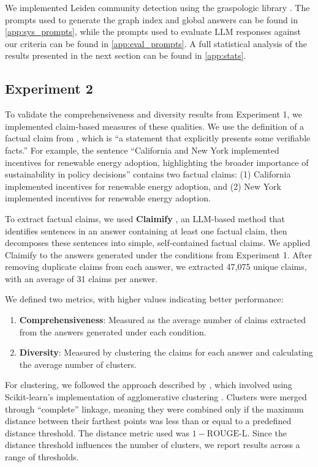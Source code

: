 \documentclass{article}
\begin{document}
We implemented Leiden community detection using the graspologic library \citep{chung2019graspy}.
The prompts used to generate the graph index and global answers can be found in \autoref{app:sys_prompts}, while the prompts used to evaluate LLM responses against our criteria can be found in \autoref{app:eval_prompts}.
A full statistical analysis of the results presented in the next section can be found in \autoref{app:stats}.

\subsection{Experiment 2}
To validate the comprehensiveness and diversity results from Experiment 1, we implemented claim-based measures of these qualities. We use the definition of a factual claim from \citet{afacta}, which is “a statement that explicitly presents some verifiable facts.” For example, the sentence “California and New York implemented incentives for renewable energy adoption, highlighting the broader importance of sustainability in policy decisions” contains two factual claims: (1) California implemented incentives for renewable energy adoption, and (2) New York implemented incentives for renewable energy adoption.

To extract factual claims, we used \textbf{Claimify} \citep{claimify}, an LLM-based method that identifies sentences in an answer containing at least one factual claim, then decomposes these sentences into simple, self-contained factual claims. We applied Claimify to the answers generated under the conditions from Experiment 1. After removing duplicate claims from each answer, we extracted 47,075 unique claims, with an average of 31 claims per answer.

We defined two metrics, with higher values indicating better performance:
\begin{enumerate}
\item \textbf{Comprehensiveness}: Measured as the average number of claims extracted from the answers generated under each condition.
\item \textbf{Diversity}: Measured by clustering the claims for each answer and calculating the average number of clusters.
\end{enumerate}

For clustering, we followed the approach described by \citet{padmakumar}, which involved using Scikit-learn’s implementation of agglomerative clustering \citep{perdregosa}. Clusters were merged through “complete” linkage, meaning they were combined only if the maximum distance between their farthest points was less than or equal to a predefined distance threshold. The distance metric used was $1 - \text{ROUGE-L}$. Since the distance threshold influences the number of clusters, we report results across a range of thresholds.
\end{document}
